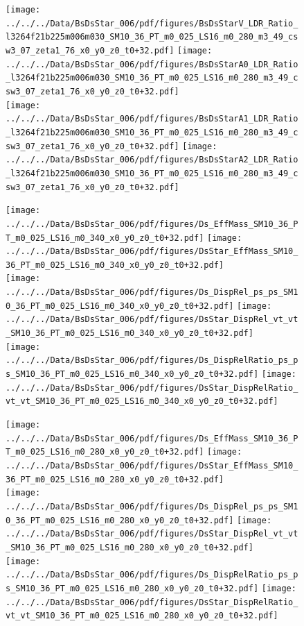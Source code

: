 \documentclass[a4paper,10pt]{article}
\begin{document}
\begin{figure}[p]
 \texttt{[image: ../../../Data/BsDsStar\_006/pdf/figures/BsDsStarV\_LDR\_Ratio\_l3264f21b225m006m030\_SM10\_36\_PT\_m0\_025\_LS16\_m0\_280\_m3\_49\_csw3\_07\_zeta1\_76\_x0\_y0\_z0\_t0+32.pdf]}  
\texttt{[image: ../../../Data/BsDsStar\_006/pdf/figures/BsDsStarA0\_LDR\_Ratio\_l3264f21b225m006m030\_SM10\_36\_PT\_m0\_025\_LS16\_m0\_280\_m3\_49\_csw3\_07\_zeta1\_76\_x0\_y0\_z0\_t0+32.pdf]} \\ 
\texttt{[image: ../../../Data/BsDsStar\_006/pdf/figures/BsDsStarA1\_LDR\_Ratio\_l3264f21b225m006m030\_SM10\_36\_PT\_m0\_025\_LS16\_m0\_280\_m3\_49\_csw3\_07\_zeta1\_76\_x0\_y0\_z0\_t0+32.pdf]}  
\texttt{[image: ../../../Data/BsDsStar\_006/pdf/figures/BsDsStarA2\_LDR\_Ratio\_l3264f21b225m006m030\_SM10\_36\_PT\_m0\_025\_LS16\_m0\_280\_m3\_49\_csw3\_07\_zeta1\_76\_x0\_y0\_z0\_t0+32.pdf]} \\ 
\end{figure} 
\clearpage

\begin{figure}[p]
 \texttt{[image: ../../../Data/BsDsStar\_006/pdf/figures/Ds\_EffMass\_SM10\_36\_PT\_m0\_025\_LS16\_m0\_340\_x0\_y0\_z0\_t0+32.pdf]}  
\texttt{[image: ../../../Data/BsDsStar\_006/pdf/figures/DsStar\_EffMass\_SM10\_36\_PT\_m0\_025\_LS16\_m0\_340\_x0\_y0\_z0\_t0+32.pdf]} \\ 
\texttt{[image: ../../../Data/BsDsStar\_006/pdf/figures/Ds\_DispRel\_ps\_ps\_SM10\_36\_PT\_m0\_025\_LS16\_m0\_340\_x0\_y0\_z0\_t0+32.pdf]}  
\texttt{[image: ../../../Data/BsDsStar\_006/pdf/figures/DsStar\_DispRel\_vt\_vt\_SM10\_36\_PT\_m0\_025\_LS16\_m0\_340\_x0\_y0\_z0\_t0+32.pdf]} \\ 
\texttt{[image: ../../../Data/BsDsStar\_006/pdf/figures/Ds\_DispRelRatio\_ps\_ps\_SM10\_36\_PT\_m0\_025\_LS16\_m0\_340\_x0\_y0\_z0\_t0+32.pdf]}  
\texttt{[image: ../../../Data/BsDsStar\_006/pdf/figures/DsStar\_DispRelRatio\_vt\_vt\_SM10\_36\_PT\_m0\_025\_LS16\_m0\_340\_x0\_y0\_z0\_t0+32.pdf]} \\ 
\end{figure} 
\clearpage

\begin{figure}[p]
 \texttt{[image: ../../../Data/BsDsStar\_006/pdf/figures/Ds\_EffMass\_SM10\_36\_PT\_m0\_025\_LS16\_m0\_280\_x0\_y0\_z0\_t0+32.pdf]}  
\texttt{[image: ../../../Data/BsDsStar\_006/pdf/figures/DsStar\_EffMass\_SM10\_36\_PT\_m0\_025\_LS16\_m0\_280\_x0\_y0\_z0\_t0+32.pdf]} \\ 
\texttt{[image: ../../../Data/BsDsStar\_006/pdf/figures/Ds\_DispRel\_ps\_ps\_SM10\_36\_PT\_m0\_025\_LS16\_m0\_280\_x0\_y0\_z0\_t0+32.pdf]}  
\texttt{[image: ../../../Data/BsDsStar\_006/pdf/figures/DsStar\_DispRel\_vt\_vt\_SM10\_36\_PT\_m0\_025\_LS16\_m0\_280\_x0\_y0\_z0\_t0+32.pdf]} \\ 
\texttt{[image: ../../../Data/BsDsStar\_006/pdf/figures/Ds\_DispRelRatio\_ps\_ps\_SM10\_36\_PT\_m0\_025\_LS16\_m0\_280\_x0\_y0\_z0\_t0+32.pdf]}  
\texttt{[image: ../../../Data/BsDsStar\_006/pdf/figures/DsStar\_DispRelRatio\_vt\_vt\_SM10\_36\_PT\_m0\_025\_LS16\_m0\_280\_x0\_y0\_z0\_t0+32.pdf]} \\ 
\end{figure} 
\clearpage
\end{document}
